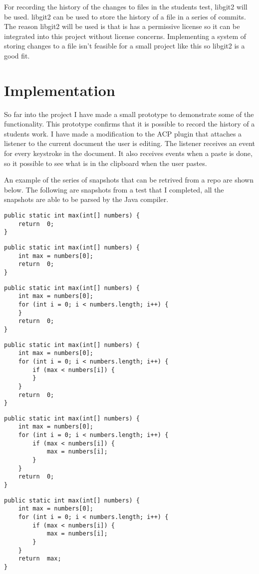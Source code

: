 \documentclass[twocolumn]{article}
\begin{document}
For recording the history of the changes to files in the students test, libgit2
will be used. libgit2 can be used to store the history of a file in a series of
commits. The reason libgit2 will be used is that is has a permissive license so
it can be integrated into this project without license concerns. Implementing a
system of storing changes to a file isn't feasible for a small project like this
so libgit2 is a good fit.

\section{Implementation}
So far into the project I have made a small prototype to demonstrate some of the
functionality. This prototype confirms that it is possible to record the history
of a students work. I have made a modification to the ACP plugin that attaches a
listener to the current document the user is editing. The listener receives an
event for every keystroke in the document. It also receives events when a paste
is done, so it possible to see what is in the clipboard when the user pastes.

An example of the series of snapshots that can be retrived from a repo are
shown below. The following are snapshots from a test that I completed, all the
snapshots are able to be parsed by the Java compiler.
\begin{lstlisting}[frame=single]
public static int max(int[] numbers) {
	return 	0;
}
\end{lstlisting}
\begin{lstlisting}[frame=single]
public static int max(int[] numbers) {
	int max = numbers[0];
	return 	0;
}
\end{lstlisting}
\begin{lstlisting}[frame=single]
public static int max(int[] numbers) {
	int max = numbers[0];
	for (int i = 0; i < numbers.length; i++) {
	}
	return 	0;
}
\end{lstlisting}
\begin{lstlisting}[frame=single]
public static int max(int[] numbers) {
	int max = numbers[0];
	for (int i = 0; i < numbers.length; i++) {
		if (max < numbers[i]) {
		}
	}
	return 	0;
}
\end{lstlisting}
\begin{lstlisting}[frame=single]
public static int max(int[] numbers) {
	int max = numbers[0];
	for (int i = 0; i < numbers.length; i++) {
		if (max < numbers[i]) {
			max = numbers[i];
		}
	}
	return 	0;
}
\end{lstlisting}
\begin{lstlisting}[frame=single]
public static int max(int[] numbers) {
	int max = numbers[0];
	for (int i = 0; i < numbers.length; i++) {
		if (max < numbers[i]) {
			max = numbers[i];
		}
	}
	return 	max;
}
\end{lstlisting}
\end{document}

